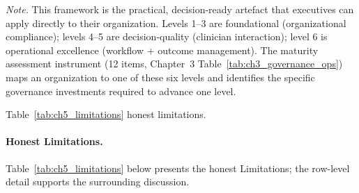 \vspace{0.4em}
\noindent\textit{Note.} This framework is the practical, decision-ready artefact that executives can apply directly to their organization. Levels 1--3 are foundational (organizational compliance); levels 4--5 are decision-quality (clinician interaction); level 6 is operational excellence (workflow + outcome management). The maturity assessment instrument (12 items, Chapter~3 Table~\ref{tab:ch3_governance_ops}) maps an organization to one of these six levels and identifies the specific governance investments required to advance one level.

\noindent Table~\ref{tab:ch5_limitations} honest limitations.

\paragraph{Honest Limitations.}


\noindent Table~\ref{tab:ch5_limitations} below presents the honest Limitations; the row-level detail supports the surrounding discussion.

